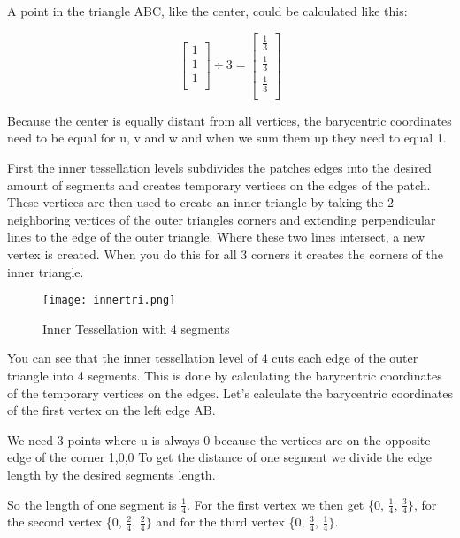 \documentclass[12pt]{report} \usepackage{preamble}
\begin{document}
A point in the triangle ABC, like the center, could be calculated like this:

\[
	\begin{bmatrix}
		1 \\
		1 \\
		1 \\
	\end{bmatrix}
	\div
	3
	=
	\begin{bmatrix}
		\frac{1}{3} \\
		\frac{1}{3} \\
		\frac{1}{3} \\
	\end{bmatrix}
\]

Because the center is equally distant from all vertices,
the barycentric coordinates need to be equal for u, v and w
and when we sum them up they need to equal 1.

First the inner tessellation levels subdivides the patches edges into the desired amount of segments and
creates temporary vertices on the edges of the patch. These vertices are then used to create an
inner triangle by taking the 2 neighboring vertices of the outer triangles corners and extending perpendicular
lines to the edge of the outer triangle. Where these two lines intersect, a new vertex is created. When you
do this for all 3 corners it creates the corners of the inner triangle. \cite{tessellation}

\begin{figure}[hbtp]
	\centering \texttt{[image: innertri.png]}
	\caption{Inner Tessellation with 4 segments}
	\cite{fig:inner-tessellation}
\end{figure} \FloatBarrier

You can see that the inner tessellation level of 4 cuts each edge of the outer triangle into 4 segments.
This is done by calculating the barycentric coordinates of the temporary vertices on the edges. Let's
calculate the barycentric coordinates of the first vertex on the left edge AB.

We need 3 points where u is always 0 because the vertices are on the opposite edge of the corner {1,0,0}
To get the distance of one segment we divide the edge length by the desired segments length.

So the length of one segment is \(\frac{1}{4}\).
For the first vertex we then get \{0, \(\frac{1}{4}\), \(\frac{3}{4}\}\), for the second
vertex \{0, \(\frac{2}{4}\), \(\frac{2}{4}\}\) and for the third vertex \{0, \(\frac{3}{4}\), \(\frac{1}{4}\}\).
\end{document}
